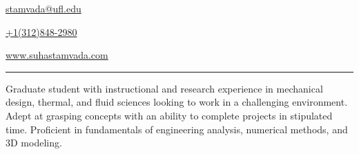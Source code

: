 \documentclass[11pt, letterpaper]{article}
\begin{document}
\begin{flushleft}
{\href{mailto:stamvada@ufl.edu}{stamvada@ufl.edu}}\hfill {} \hfill \raggedright{\href{tel:3128482980}{+1(312)848-2980}}
\end{flushleft}
\begin{flushleft}
{\href{https://www.suhastamvada.com}{www.suhastamvada.com}} \hfill {} \hfill \raggedright{\href{https://www.linkedin.com/in/suhastamvada/}{}}
\end{flushleft}
\vspace{-8pt}
\noindent \rule[2pt]{\textwidth}{0.5pt} %
Graduate student with instructional and research experience in mechanical design, thermal, and fluid sciences looking to work in a challenging environment. Adept at grasping concepts with an ability to complete projects in stipulated time. Proficient in fundamentals of engineering analysis, numerical methods, and 3D modeling. %
\end{document}

